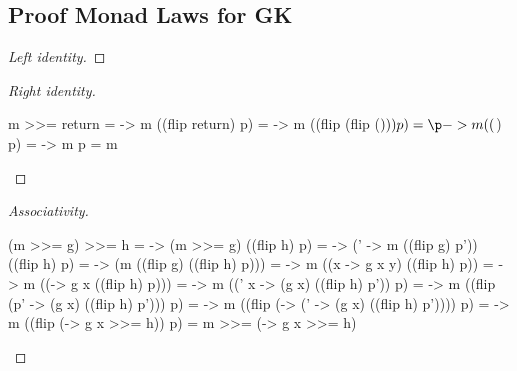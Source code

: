 \documentclass[runningheads]{llncs}
\begin{document}
\subsection*{Proof Monad Laws for GK}\label{GK-monad-laws}
\begin{proof}[Left identity]
\end{proof}
\begin{proof}[Right identity]
\begin{haskell}
m >>= return
= \p -> m ((flip return) p)
= \p -> m ((flip (flip ($))) p)
= \p -> m (($) p)
= \p -> m p
= m
\end{haskell}
\end{proof}
\begin{proof}[Associativity]
\begin{haskell}
(m >>= g) >>= h
= \p -> (m >>= g) ((flip h) p)
= \p -> (\p' -> m ((flip g) p')) ((flip h) p)
= \p -> (m ((flip g) ((flip h) p)))
= \p -> m ((\y x -> g x y) ((flip h) p))
= \p -> m ((\x -> g x ((flip h) p)))
= \p -> m ((\p' x -> (g x) ((flip h) p')) p)
= \p -> m ((flip (\x p' -> (g x) ((flip h) p'))) p)
= \p -> m ((flip (\x -> (\p' -> (g x) ((flip h) p')))) p)
= \p -> m ((flip (\x -> g x >>= h)) p)
= m >>= (\x -> g x >>= h)
\end{haskell}
\end{proof}
\end{document}
